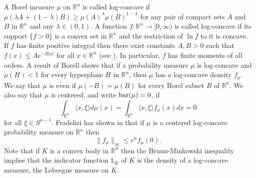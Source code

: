\documentclass[11pt,leqno]{article}
\theoremstyle{definition}
\theoremstyle{remark}
\numberwithin{equation}{section}
\newcommand{\ls}{\leqslant}
\newcommand{\gr}{\geqslant}
\newcommand{\1}{\textbf{1}}
\begin{document}
A Borel measure $\mu$ on $\mathbb R^n$ is called log-concave if $\mu(\lambda
A+(1-\lambda)B) \gr \mu(A)^{\lambda}\mu(B)^{1-\lambda}$ for any pair of compact sets $A$
and $B$ in ${\mathbb R}^n$ and any $\lambda \in (0,1)$. A function
$f:\mathbb R^n \rightarrow [0,\infty)$ is called log-concave if
its support $\{f>0\}$ is a convex set in ${\mathbb R}^n$ and the restriction of $\ln{f}$ to it is concave.
If $f$ has finite positive integral then there exist constants $A,B>0$ such that $f(x)\ls Ae^{-B|x|}$
for all $x\in {\mathbb R}^n$ (see \cite[Lemma~2.2.1]{BGVV-book}). In particular, $f$ has finite moments
of all orders. A result of Borell \cite{Borell-1974} shows that if a probability measure $\mu $ is log-concave and $\mu (H)<1$ for every
hyperplane $H$ in ${\mathbb R}^n$, then $\mu $ has a log-concave density $f_{{\mu }}$.
We say that $\mu $ is even if $\mu (-B)=\mu (B)$ for every Borel subset $B$ of ${\mathbb R}^n$. We also say that $\mu $ is centered,
and write ${\rm bar}(\mu)=0$, if
\begin{equation*}
\int_{\mathbb R^n} \langle x, \xi \rangle d\mu(x) = \int_{\mathbb R^n} \langle x, \xi \rangle f_{\mu}(x) dx = 0
\end{equation*} for all $\xi\in S^{n-1}$. Fradelizi has shown in \cite{Fradelizi-1997} that if $\mu $ is a centered log-concave
probability measure on ${\mathbb R}^n$ then
\begin{equation}\label{eq:frad-2}\|f_{\mu }\|_{\infty }\ls e^nf_{\mu }(0).\end{equation}
Note that if $K$ is a convex body in $\mathbb R^n$ then the Brunn-Minkowski inequality implies that the indicator function
$\mathds{1}_{K} $ of $K$ is the density of a log-concave measure, the Lebesgue measure on $K$.
\end{document}
